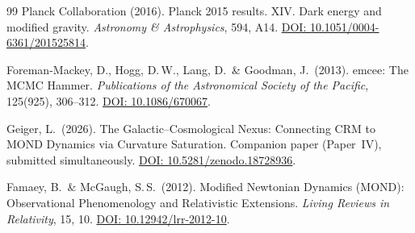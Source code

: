 \documentclass[aps,prd,twocolumn,superscriptaddress,nofootinbib]{revtex4-2}
\begin{document}
\begin{thebibliography}{99}
Planck Collaboration (2016).
Planck 2015 results. XIV. Dark energy and modified gravity.
\textit{Astronomy \& Astrophysics}, 594, A14.
\href{https://doi.org/10.1051/0004-6361/201525814}{DOI: 10.1051/0004-6361/201525814}.

Foreman-Mackey, D., Hogg, D.\,W., Lang, D.\ \& Goodman, J.\ (2013).
emcee: The MCMC Hammer.
\textit{Publications of the Astronomical Society of the Pacific}, 125(925), 306--312.
\href{https://doi.org/10.1086/670067}{DOI: 10.1086/670067}.

Geiger, L.\ (2026).
The Galactic--Cosmological Nexus: Connecting CRM to MOND Dynamics via Curvature Saturation.
Companion paper (Paper~IV), submitted simultaneously. \href{https://doi.org/10.5281/zenodo.18728936}{DOI: 10.5281/zenodo.18728936}.

Famaey, B.\ \& McGaugh, S.\,S.\ (2012).
Modified Newtonian Dynamics (MOND): Observational Phenomenology and Relativistic Extensions.
\textit{Living Reviews in Relativity}, 15, 10.
\href{https://doi.org/10.12942/lrr-2012-10}{DOI: 10.12942/lrr-2012-10}.

\end{thebibliography}
\end{document}
